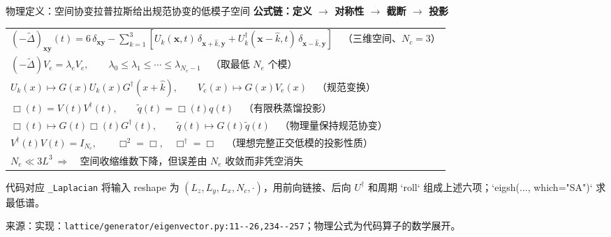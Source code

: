 \documentclass[UTF8,aspectratio=169,11pt]{ctexbeamer}
\newcommand{\source}[1]{%
  \vspace{0.06em}\par{\raggedright\scriptsize\color{muted}来源：#1\par}}
\newcommand{\codepath}[1]{\nolinkurl{#1}}
\begin{document}
\begin{frame}[t]{物理定义：空间协变拉普拉斯给出规范协变的低模子空间}
  \centering
  \textbf{公式链：定义 $\to$ 对称性 $\to$ 截断 $\to$ 投影}
  \vspace{0.08cm}
  \begin{tabular}{@{}l@{}}
    $\displaystyle (-\widetilde\Delta)_{\boldsymbol x\boldsymbol y}(t)
      =6\,\delta_{\boldsymbol x\boldsymbol y}
      -\sum_{k=1}^{3}\left[U_k(\boldsymbol x,t)\,\delta_{\boldsymbol x+\hat k,\boldsymbol y}
      +U_k^\dagger(\boldsymbol x-\hat k,t)\,\delta_{\boldsymbol x-\hat k,\boldsymbol y}\right]
      \quad \text{（三维空间、}N_c=3\text{）}$ \\
    $\displaystyle (-\widetilde\Delta)V_e=\lambda_eV_e,\qquad
      \lambda_0\le\lambda_1\le\cdots\le\lambda_{N_e-1}
      \quad \text{（取最低 }N_e\text{ 个模）}$ \\
    $\displaystyle U_k(x)\mapsto G(x)U_k(x)G^\dagger(x+\hat k),\qquad
      V_e(x)\mapsto G(x)V_e(x)
      \quad \text{（规范变换）}$ \\
    $\displaystyle \Box(t)=V(t)V^\dagger(t),\qquad
      \widetilde q(t)=\Box(t)q(t)
      \quad \text{（有限秩蒸馏投影）}$ \\
    $\displaystyle \Box(t)\mapsto G(t)\Box(t)G^\dagger(t),\qquad
      \widetilde q(t)\mapsto G(t)\widetilde q(t)
      \quad \text{（物理量保持规范协变）}$ \\
    $\displaystyle V^\dagger(t)V(t)=I_{N_e},\qquad
      \Box^2=\Box,\quad \Box^\dagger=\Box
      \quad \text{（理想完整正交低模的投影性质）}$ \\
    $\displaystyle N_e\ll 3L^3\ \Longrightarrow\quad
      \text{空间收缩维数下降，但误差由 }N_e\text{ 收敛而非凭空消失}$
  \end{tabular}
  \vspace{0.1cm}
  \begin{block}{代码对应}
    \small
    \texttt{\_Laplacian} 将输入 reshape 为 $(L_z,L_y,L_x,N_c,\cdot)$，用前向链接、后向
    $U^\dagger$ 和周期 `roll` 组成上述六项；`eigsh(..., which="SA")` 求最低谱。
  \end{block}
  \source{实现：\codepath{lattice/generator/eigenvector.py:11--26,234--257}；物理公式为代码算子的数学展开。}
\end{frame}
\end{document}
